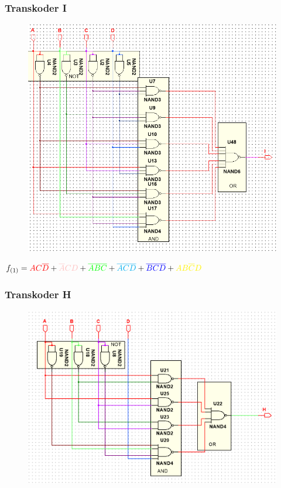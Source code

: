 \documentclass[a4paper]{article}
\begin{document}
\subsubsection{Transkoder I}
\begin{figure}[H]
 \centering
 \includegraphics{schemat_I.png}
\end{figure}

\begin{center}
  $f_{(1)} = 
    \textcolor{red}{AC\overline{D}} + 
    \textcolor{pink}{\overline{A}CD} +
    \textcolor{green}{\overline{ABC}} +
    \textcolor{cyan}{\overline{ACD}} +
    \textcolor{blue}{\overline{BCD}} +
    \textcolor{yellow}{AB\overline{C}D} $
\end{center}

\subsubsection{Transkoder H}
\begin{figure}[H]
 \centering
 \includegraphics{schemat_H.png}
\end{figure}
\end{document}
